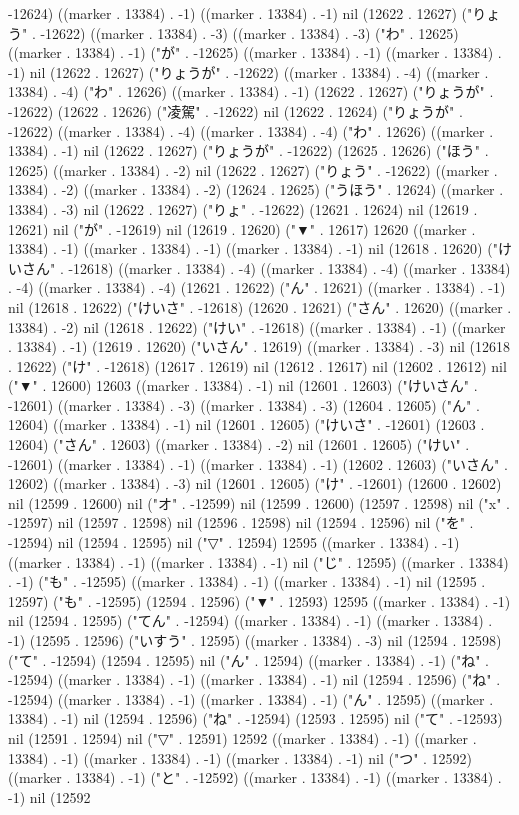 -12624) ((marker . 13384) . -1) ((marker . 13384) . -1) nil (12622 . 12627) ("りょう" . -12622) ((marker . 13384) . -3) ((marker . 13384) . -3) ("わ" . 12625) ((marker . 13384) . -1) ("が" . -12625) ((marker . 13384) . -1) ((marker . 13384) . -1) nil (12622 . 12627) ("りょうが" . -12622) ((marker . 13384) . -4) ((marker . 13384) . -4) ("わ" . 12626) ((marker . 13384) . -1) (12622 . 12627) ("りょうが" . -12622) (12622 . 12626) ("凌駕" . -12622) nil (12622 . 12624) ("りょうが" . -12622) ((marker . 13384) . -4) ((marker . 13384) . -4) ("わ" . 12626) ((marker . 13384) . -1) nil (12622 . 12627) ("りょうが" . -12622) (12625 . 12626) ("ほう" . 12625) ((marker . 13384) . -2) nil (12622 . 12627) ("りょう" . -12622) ((marker . 13384) . -2) ((marker . 13384) . -2) (12624 . 12625) ("うほう" . 12624) ((marker . 13384) . -3) nil (12622 . 12627) ("りょ" . -12622) (12621 . 12624) nil (12619 . 12621) nil ("が" . -12619) nil (12619 . 12620) ("▼" . 12617) 12620 ((marker . 13384) . -1) ((marker . 13384) . -1) ((marker . 13384) . -1) nil (12618 . 12620) ("けいさん" . -12618) ((marker . 13384) . -4) ((marker . 13384) . -4) ((marker . 13384) . -4) ((marker . 13384) . -4) (12621 . 12622) ("ん" . 12621) ((marker . 13384) . -1) nil (12618 . 12622) ("けいさ" . -12618) (12620 . 12621) ("さん" . 12620) ((marker . 13384) . -2) nil (12618 . 12622) ("けい" . -12618) ((marker . 13384) . -1) ((marker . 13384) . -1) (12619 . 12620) ("いさん" . 12619) ((marker . 13384) . -3) nil (12618 . 12622) ("け" . -12618) (12617 . 12619) nil (12612 . 12617) nil (12602 . 12612) nil ("▼" . 12600) 12603 ((marker . 13384) . -1) nil (12601 . 12603) ("けいさん" . -12601) ((marker . 13384) . -3) ((marker . 13384) . -3) (12604 . 12605) ("ん" . 12604) ((marker . 13384) . -1) nil (12601 . 12605) ("けいさ" . -12601) (12603 . 12604) ("さん" . 12603) ((marker . 13384) . -2) nil (12601 . 12605) ("けい" . -12601) ((marker . 13384) . -1) ((marker . 13384) . -1) (12602 . 12603) ("いさん" . 12602) ((marker . 13384) . -3) nil (12601 . 12605) ("け" . -12601) (12600 . 12602) nil (12599 . 12600) nil ("オ" . -12599) nil (12599 . 12600) (12597 . 12598) nil ("x" . -12597) nil (12597 . 12598) nil (12596 . 12598) nil (12594 . 12596) nil ("を" . -12594) nil (12594 . 12595) nil ("▽" . 12594) 12595 ((marker . 13384) . -1) ((marker . 13384) . -1) ((marker . 13384) . -1) nil ("じ" . 12595) ((marker . 13384) . -1) ("も" . -12595) ((marker . 13384) . -1) ((marker . 13384) . -1) nil (12595 . 12597) ("も" . -12595) (12594 . 12596) ("▼" . 12593) 12595 ((marker . 13384) . -1) nil (12594 . 12595) ("てん" . -12594) ((marker . 13384) . -1) ((marker . 13384) . -1) (12595 . 12596) ("いすう" . 12595) ((marker . 13384) . -3) nil (12594 . 12598) ("て" . -12594) (12594 . 12595) nil ("ん" . 12594) ((marker . 13384) . -1) ("ね" . -12594) ((marker . 13384) . -1) ((marker . 13384) . -1) nil (12594 . 12596) ("ね" . -12594) ((marker . 13384) . -1) ((marker . 13384) . -1) ("ん" . 12595) ((marker . 13384) . -1) nil (12594 . 12596) ("ね" . -12594) (12593 . 12595) nil ("て" . -12593) nil (12591 . 12594) nil ("▽" . 12591) 12592 ((marker . 13384) . -1) ((marker . 13384) . -1) ((marker . 13384) . -1) ((marker . 13384) . -1) nil ("つ" . 12592) ((marker . 13384) . -1) ("と" . -12592) ((marker . 13384) . -1) ((marker . 13384) . -1) nil (12592 